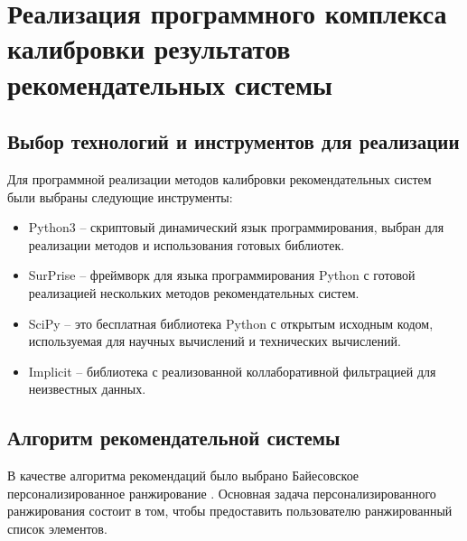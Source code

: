 \section{Реализация программного комплекса калибровки результатов рекомендательных системы}
\subsection{Выбор технологий и инструментов для реализации}
Для программной реализации методов калибровки рекомендательных систем были выбраны следующие инструменты:
\begin{itemize} 
    \item Python3 -- скриптовый динамический язык программирования, 
    выбран для реализации методов и использования готовых библиотек.
    \item SurPrise \cite{sur} -- фреймворк для языка программирования Python
    с готовой реализацией нескольких методов рекомендательных систем.
    \item SciPy \cite{Scipy} -- это бесплатная библиотека Python с открытым исходным кодом, используемая для научных вычислений и технических вычислений.
    \item Implicit \cite{imp} -- библиотека с реализованной коллаборативной фильтрацией для неизвестных данных.
  \end{itemize}

\subsection{Алгоритм рекомендательной системы}

В качестве алгоритма рекомендаций было выбрано Байесовское 
персонализированное ранжирование \cite{bib8}. 
Основная задача персонализированного ранжирования состоит 
в том, чтобы предоставить пользователю ранжированный список 
элементов.

